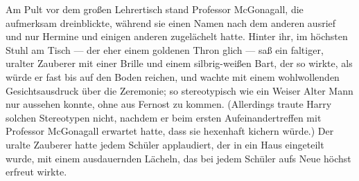 Am Pult vor dem großen Lehrertisch stand Professor McGonagall, die aufmerksam dreinblickte, während sie einen Namen nach dem anderen ausrief und nur Hermine und einigen anderen zugelächelt hatte. Hinter ihr, im höchsten Stuhl am Tisch — der eher einem goldenen Thron glich — saß ein faltiger, uralter Zauberer mit einer Brille und einem silbrig-weißen Bart, der so wirkte, als würde er fast bis auf den Boden reichen, und wachte mit einem wohlwollenden Gesichtsausdruck über die Zeremonie; so stereotypisch wie ein Weiser Alter Mann nur aussehen konnte, ohne aus Fernost zu kommen. (Allerdings traute Harry solchen Stereotypen nicht, nachdem er beim ersten Aufeinandertreffen mit Professor McGonagall erwartet hatte, dass sie hexenhaft kichern würde.) Der uralte Zauberer hatte jedem Schüler applaudiert, der in ein Haus eingeteilt wurde, mit einem ausdauernden Lächeln, das bei jedem Schüler aufs Neue höchst erfreut wirkte.

